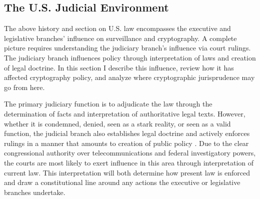 


\lawsend

\subsection{The U.S. Judicial Environment}
\label{sec-us-judicial}

The above history and section on U.S. law encompasses the executive and legislative branches' influence on surveillance
and cryptography. A complete picture requires understanding the judiciary branch's influence via court rulings. The
judiciary branch influences policy through interpretation of laws and creation of legal doctrine. In this section I
describe this influence, review how it has affected cryptography policy, and analyze where cryptographic jurisprudence
may go from here.

The primary judiciary function is to adjudicate the law through the determination of facts and interpretation of
authoritative legal texts. However, whether it is condemned, denied, seen as a stark reality, or seen as a valid
function, the judicial branch also establishes legal doctrine and actively enforces rulings in a manner that amounts to
creation of public policy \cite{feeley_judicial_2000}. Due to the clear congressional authority over telecommunications
and federal investigatory powers, the courts are most likely to exert influence in this area through interpretation of
current law. This interpretation will both determine how present law is enforced and draw a constitutional line around
any actions the executive or legislative branches undertake.


